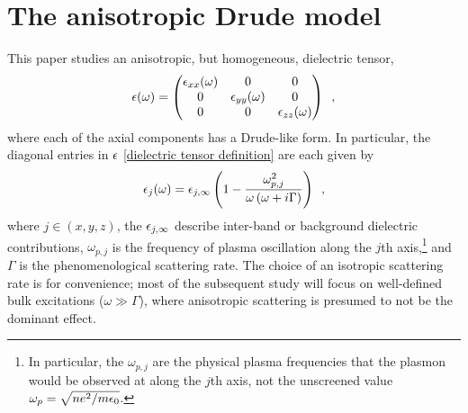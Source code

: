 \section{The anisotropic Drude model}

This paper studies an anisotropic, but homogeneous, dielectric tensor,
\begin{equation}
    \label{dielectric tensor definition}
    \epsilon(\omega) = \begin{pmatrix}
    \epsilon_{xx}(\omega) & 0 & 0
    \\ 0 & \epsilon_{yy}(\omega) & 0
    \\ 0 & 0 & \epsilon_{zz}(\omega)
    \end{pmatrix}
    \,\,\,,
\end{equation}
where each of the axial components has a Drude-like form.  In particular, the diagonal entries in $\epsilon$ \eqref{dielectric tensor definition} are each given by
\begin{equation}
    \label{dielectric component Drude definition}
    \epsilon_j(\omega) = \epsilon_{j,\infty}\left( 1-\frac{\omega_{p,j}^2}{\omega\left(\omega+i\Gamma\right)}\right)\,\,\,,
\end{equation}
where $j\in(x,y,z)$, the $\epsilon_{j,\infty}$ describe inter-band or background dielectric contributions, $\omega_{p,j}$ is the frequency of plasma oscillation along the $j$th axis,\footnote{In particular, the $\omega_{p,j}$ are the physical plasma frequencies that the plasmon would be observed at along the $j$th axis, not the unscreened value $\omega_p=\sqrt{ne^2/m\epsilon_0}$.} and $\Gamma$ is the phenomenological scattering rate.  The choice of an isotropic scattering rate is for convenience; most of the subsequent study will focus on well-defined bulk excitations ($\omega\gg\Gamma$), where anisotropic scattering is presumed to not be the dominant effect.